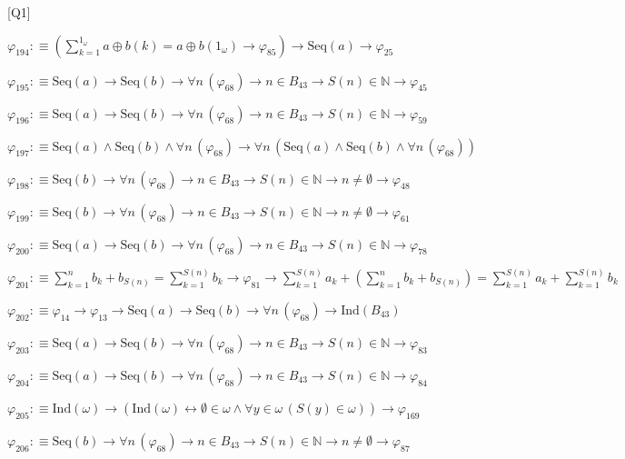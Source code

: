 \begin{fullproof}{[Q1]}
\begin{abbrevlist}
\item $\varphi_{194} :\equiv ({\textstyle\sum_{k=1}^{1_{\omega}} a \oplus b(k)} = a \oplus b(1_{\omega}) \to \varphi_{85}) \to \mathrm{Seq}(a) \to \varphi_{25}$
\item $\varphi_{195} :\equiv \mathrm{Seq}(a) \to \mathrm{Seq}(b) \to \forall n\,(\varphi_{68}) \to n \in B_{43} \to S(n) \in \mathbb{N} \to \varphi_{45}$
\item $\varphi_{196} :\equiv \mathrm{Seq}(a) \to \mathrm{Seq}(b) \to \forall n\,(\varphi_{68}) \to n \in B_{43} \to S(n) \in \mathbb{N} \to \varphi_{59}$
\item $\varphi_{197} :\equiv \mathrm{Seq}(a) \land \mathrm{Seq}(b) \land \forall n\,(\varphi_{68}) \to \forall n\,(\mathrm{Seq}(a) \land \mathrm{Seq}(b) \land \forall n\,(\varphi_{68}))$
\item $\varphi_{198} :\equiv \mathrm{Seq}(b) \to \forall n\,(\varphi_{68}) \to n \in B_{43} \to S(n) \in \mathbb{N} \to n \neq \emptyset \to \varphi_{48}$
\item $\varphi_{199} :\equiv \mathrm{Seq}(b) \to \forall n\,(\varphi_{68}) \to n \in B_{43} \to S(n) \in \mathbb{N} \to n \neq \emptyset \to \varphi_{61}$
\item $\varphi_{200} :\equiv \mathrm{Seq}(a) \to \mathrm{Seq}(b) \to \forall n\,(\varphi_{68}) \to n \in B_{43} \to S(n) \in \mathbb{N} \to \varphi_{78}$
\item $\varphi_{201} :\equiv {\textstyle\sum_{k=1}^{n} b_{k}} + b_{S(n)} = {\textstyle\sum_{k=1}^{S(n)} b_{k}} \to \varphi_{81} \to {\textstyle\sum_{k=1}^{S(n)} a_{k}} + ({\textstyle\sum_{k=1}^{n} b_{k}} + b_{S(n)}) = {\textstyle\sum_{k=1}^{S(n)} a_{k}} + {\textstyle\sum_{k=1}^{S(n)} b_{k}}$
\item $\varphi_{202} :\equiv \varphi_{14} \to \varphi_{13} \to \mathrm{Seq}(a) \to \mathrm{Seq}(b) \to \forall n\,(\varphi_{68}) \to \mathrm{Ind}(B_{43})$
\item $\varphi_{203} :\equiv \mathrm{Seq}(a) \to \mathrm{Seq}(b) \to \forall n\,(\varphi_{68}) \to n \in B_{43} \to S(n) \in \mathbb{N} \to \varphi_{83}$
\item $\varphi_{204} :\equiv \mathrm{Seq}(a) \to \mathrm{Seq}(b) \to \forall n\,(\varphi_{68}) \to n \in B_{43} \to S(n) \in \mathbb{N} \to \varphi_{84}$
\item $\varphi_{205} :\equiv \mathrm{Ind}(\omega) \to (\mathrm{Ind}(\omega) \leftrightarrow \emptyset \in \omega \land \forall y \in \omega\,(S(y) \in \omega)) \to \varphi_{169}$
\item $\varphi_{206} :\equiv \mathrm{Seq}(b) \to \forall n\,(\varphi_{68}) \to n \in B_{43} \to S(n) \in \mathbb{N} \to n \neq \emptyset \to \varphi_{87}$

\end{abbrevlist}
\end{fullproof}
